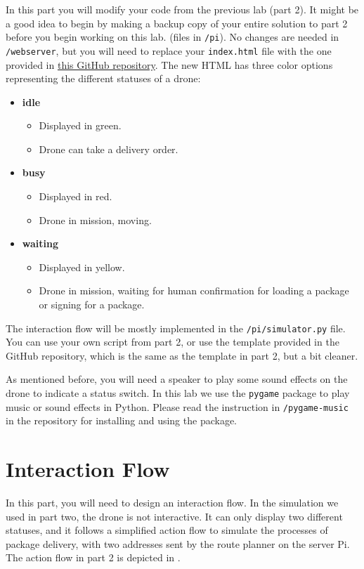 \documentclass{article}
\begin{document}
In this part you will modify your code from the previous lab (part 2). It might be a good idea to
begin by making a backup copy of your entire solution to part 2 before you begin working on this lab. (files in \verb!/pi!). No changes are needed in \verb!/webserver!, but you will need to replace your \verb!index.html! file with the one provided in \textcolor{blue}{\href{https://github.com/HaoruiPeng/InfoCom-LP3-Lab3}{this GitHub repository}}. The new HTML has three color options representing the different statuses of a drone:
\begin{itemize}
    \item \textbf{idle}
    \begin{itemize}
        \item Displayed in green.
        \item Drone can take a delivery order.
    \end{itemize}
    \item \textbf{busy}
    \begin{itemize}
        \item Displayed in red.
        \item Drone in mission, moving.
    \end{itemize}
    
    \item \textbf{waiting}
    \begin{itemize}
        \item Displayed in yellow.
        \item Drone in mission,  waiting for human confirmation for loading a package or signing for a package.
    \end{itemize}
\end{itemize}
The interaction flow will be mostly implemented in the \verb!/pi/simulator.py! file. You can use your own script from part 2, or use the template provided in the GitHub repository, which is the same as the template in part 2, but a bit cleaner.

As mentioned before, you will need a speaker to play some sound effects on the drone to indicate a status switch. In this lab we use the \verb!pygame! package to play music or sound effects in Python. Please read the instruction in \verb!/pygame-music! in the repository for installing and using the package.


\section{Interaction Flow}
In this part, you will need to design an interaction flow. In the simulation we used in part two, the drone is not interactive. It can only display two different statuses, and it follows a simplified action flow to simulate the processes of package delivery, with two addresses sent by the route planner on the server Pi. The action flow in part 2 is depicted in .
\end{document}
